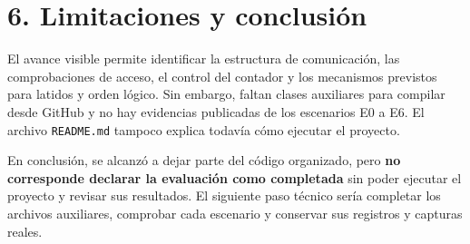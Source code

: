 \documentclass[11pt,a4paper]{article}
\begin{document}
\section*{6. Limitaciones y conclusión}
El avance visible permite identificar la estructura de comunicación, las comprobaciones de acceso, el control del contador y los mecanismos previstos para latidos y orden lógico. Sin embargo, faltan clases auxiliares para compilar desde GitHub y no hay evidencias publicadas de los escenarios E0 a E6. El archivo \texttt{README.md} tampoco explica todavía cómo ejecutar el proyecto.

En conclusión, se alcanzó a dejar parte del código organizado, pero \textbf{no corresponde declarar la evaluación como completada} sin poder ejecutar el proyecto y revisar sus resultados. El siguiente paso técnico sería completar los archivos auxiliares, comprobar cada escenario y conservar sus registros y capturas reales.
\end{document}
